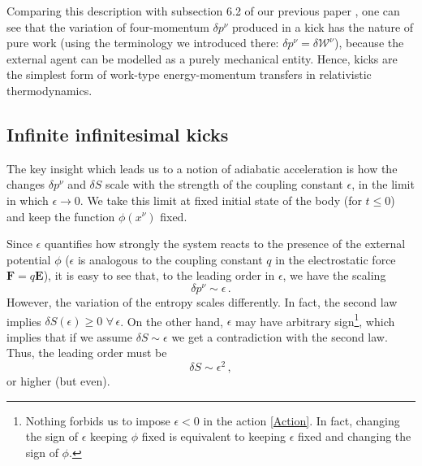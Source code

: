 \documentclass[twocolumn,usenatbib]{mnras2}
\begin{document}
Comparing this description with subsection 6.2 of our previous paper \citep{GavassinoTermometri}, one can see that the variation of four-momentum $\delta p^\nu$ produced in a kick has the nature of pure work (using the terminology we introduced there: $\delta p^\nu = \delta \mathcal{W}^\nu$), because the external agent can be modelled as a purely mechanical entity. Hence, kicks are the simplest form of work-type energy-momentum transfers in relativistic thermodynamics.



\subsection{Infinite infinitesimal kicks}\label{infinite infitesimal}

The key insight which leads us to a notion of adiabatic acceleration is how the changes $\delta p^\nu$ and $\delta S$ scale with the strength of the coupling constant $\epsilon$, in the limit in which $\epsilon \rightarrow 0$. We take this limit at fixed initial state of the body (for $t \leq 0$) and keep the function $\phi(x^\nu)$ fixed.

Since $\epsilon$ quantifies how strongly the system reacts to the presence of the external potential $\phi$ ($\epsilon$ is analogous to the coupling constant $q$ in the electrostatic force $\textbf{F}=q\textbf{E}$), it is easy to see that, to the leading order in $\epsilon$, we have the scaling
\begin{equation}\label{dpe}
\delta p^\nu \sim \epsilon \, .
\end{equation}
However, the variation of the entropy scales differently. In fact, the second law implies $\delta S(\epsilon) \geq 0$ $\forall \, \epsilon$. On the other hand, $\epsilon$ may have arbitrary sign\footnote{Nothing forbids us to impose $\epsilon <0$ in the action \eqref{Action}. In fact, changing the sign of $\epsilon$ keeping $\phi$ fixed is equivalent to keeping $\epsilon$ fixed and changing the sign of $\phi$.}, which implies that if we assume $\delta S \sim \epsilon$ we get a contradiction with the second law. Thus, the leading order must be
\begin{equation}\label{dse}
\delta S \sim \epsilon^2 \, ,
\end{equation}
or higher (but even).
\end{document}
